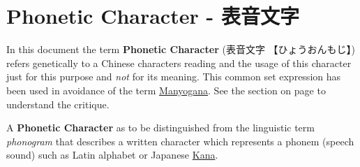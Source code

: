\section{Phonetic Character - 表音文字} \label{sec:PhoneticCharacter}

In this document the term \textbf{Phonetic Character} ({表音文字}
{【ひょうおんもじ】}) refers genetically to a Chinese characters reading and
the usage of this character just for this purpose and \textit{not} for its
meaning. This common set expression has been used in avoidance of the term
\hyperref[sec:Manyogana]{Manyogana}. See the section  on
page \pageref{sec:Manyogana} to understand the critique.

A \textbf{Phonetic Character} as to be distinguished from the linguistic term
\textit{phonogram} that describes a written character which represents a phonem
(speech sound) such as Latin alphabet or Japanese \hyperref[sec:Kana]{Kana}. 

